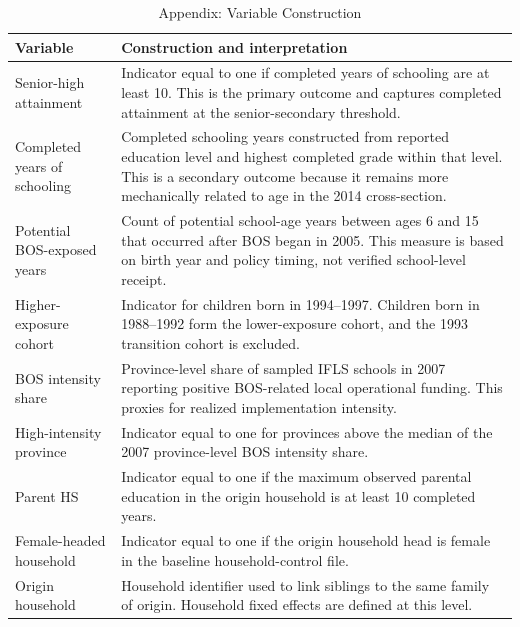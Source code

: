 \begin{table}[H]
\centering
\caption{Appendix: Variable Construction\label{tab:appendix_variable_construction}}
\small
\begin{tabularx}{\textwidth}{@{}p{}X@{}}
\toprule
Variable & Construction and interpretation \\
\midrule
Senior-high attainment & Indicator equal to one if completed years of schooling are at least 10. This is the primary outcome and captures completed attainment at the senior-secondary threshold. \\
Completed years of schooling & Completed schooling years constructed from reported education level and highest completed grade within that level. This is a secondary outcome because it remains more mechanically related to age in the 2014 cross-section. \\
Potential BOS-exposed years & Count of potential school-age years between ages 6 and 15 that occurred after BOS began in 2005. This measure is based on birth year and policy timing, not verified school-level receipt. \\
Higher-exposure cohort & Indicator for children born in 1994--1997. Children born in 1988--1992 form the lower-exposure cohort, and the 1993 transition cohort is excluded. \\
BOS intensity share & Province-level share of sampled IFLS schools in 2007 reporting positive BOS-related local operational funding. This proxies for realized implementation intensity. \\
High-intensity province & Indicator equal to one for provinces above the median of the 2007 province-level BOS intensity share. \\
Parent HS & Indicator equal to one if the maximum observed parental education in the origin household is at least 10 completed years. \\
Female-headed household & Indicator equal to one if the origin household head is female in the baseline household-control file. \\
Origin household & Household identifier used to link siblings to the same family of origin. Household fixed effects are defined at this level. \\
\bottomrule
\end{tabularx}
\end{table}
